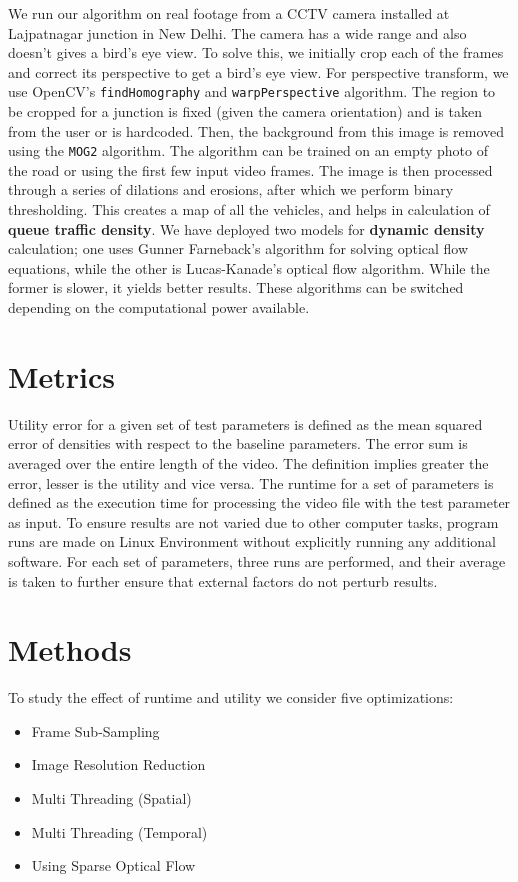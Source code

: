 \documentclass[conference]{IEEEtran}
\begin{document}
We run our algorithm on real footage from a CCTV camera installed at Lajpatnagar junction in New Delhi. \cite{b1}
The camera has a wide range and also doesn't gives a bird's eye view. To solve this, we initially crop each of the frames and correct its perspective to get a bird's eye view.
For perspective transform, we use OpenCV's \verb|findHomography| and \verb|warpPerspective| algorithm. \cite{b2}
The region to be cropped for a junction is fixed (given the camera orientation) and is taken from the user or is hardcoded.
Then, the background from this image is removed using the \verb|MOG2| algorithm. The algorithm can be trained on an empty photo of the road or using the first few input video frames.
The image is then processed through a series of dilations and erosions, after which we perform binary thresholding. This creates a map of all the vehicles, and helps in calculation of {\bfseries{queue traffic density}}.
We have deployed two models for \textbf{dynamic density} calculation; one uses Gunner Farneback's algorithm \cite{b4} for solving optical flow equations, while the other is Lucas-Kanade's optical flow algorithm. \cite{b5}
While the former is slower, it yields better results. These algorithms can be switched depending on the computational power available.

\section{Metrics}

Utility error for a given set of test parameters is defined as the mean squared error of densities with respect to the baseline parameters. The error sum is averaged over the entire length of the video. The definition implies greater the error, lesser is the utility and vice versa.
The runtime for a set of parameters is defined as the execution time for processing the video file with the test parameter as input. To ensure results are not varied due to other computer tasks,
program runs are made on Linux Environment without explicitly running any additional software. For each set of parameters, three runs are performed, and their average is taken to further ensure that external factors do not perturb results.
\section{Methods}

To study the effect of runtime and utility we consider five optimizations:
\begin{itemize}
    \item Frame Sub-Sampling
    \item Image Resolution Reduction
    \item Multi Threading (Spatial)
    \item Multi Threading (Temporal)
    \item Using Sparse Optical Flow
\end{itemize}
\end{document}
